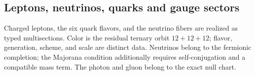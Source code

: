 \let\clearpage\relax

\endgroup
\begingroup
\let\chapter\section
\let\section\subsection
\let\subsection\subsubsection
\let\subsubsection\paragraph
\let\clearpage\relax

\endgroup

\section{Leptons, neutrinos, quarks and gauge sectors}
Charged leptons, the six quark flavors, and the neutrino fibers are
realized as typed multisections. Color is the residual ternary orbit
\(12+12+12\); flavor, generation, scheme, and scale are distinct data. Neutrinos
belong to the fermionic completion; the Majorana condition
additionally requires self-conjugation and a compatible mass term. The photon and gluon
belong to the exact null chart.

